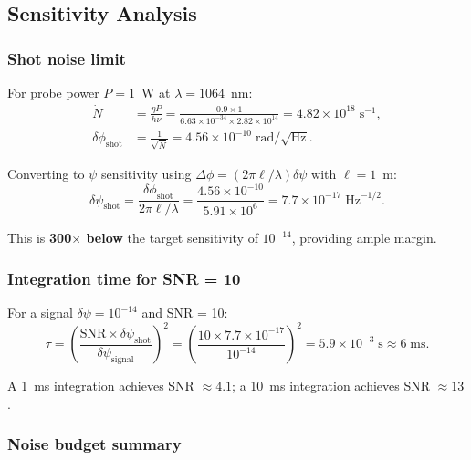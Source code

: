 \documentclass[11pt,letterpaper]{article}
\newcommand{\ee}[1]{\times 10^{#1}}
\newcommand{\psifield}{\psi}
\begin{document}
\subsection{Sensitivity Analysis}

\subsubsection{Shot noise limit}

For probe power $P = 1$~W at $\lambda = 1064$~nm:
\begin{align}
\dot{N} &= \frac{\eta P}{h\nu}
= \frac{0.9 \times 1}{6.63\ee{-34}\times 2.82\ee{14}}
= 4.82\ee{18}\;\text{s}^{-1}, \\
\delta\phi_\text{shot} &= \frac{1}{\sqrt{\dot{N}}}
= 4.56\ee{-10}\;\text{rad}/\sqrt{\text{Hz}}.
\end{align}

Converting to $\psifield$ sensitivity using
$\Delta\phi = (2\pi\ell/\lambda)\delta\psifield$ with $\ell = 1$~m:
\begin{equation}
\delta\psifield_\text{shot} = \frac{\delta\phi_\text{shot}}
{2\pi\ell/\lambda} = \frac{4.56\ee{-10}}{5.91\ee{6}}
= 7.7\ee{-17}\;\text{Hz}^{-1/2}.
\label{eq:psi_sensitivity}
\end{equation}

This is \textbf{300$\times$ below} the target sensitivity of
$10^{-14}$, providing ample margin.

\subsubsection{Integration time for SNR = 10}

For a signal $\delta\psifield = 10^{-14}$ and SNR = 10:
\begin{equation}
\tau = \left(\frac{\text{SNR}\times\delta\psifield_\text{shot}}
{\delta\psifield_\text{signal}}\right)^2
= \left(\frac{10\times 7.7\ee{-17}}{10^{-14}}\right)^2
= 5.9\ee{-3}\;\text{s} \approx 6\;\text{ms}.
\end{equation}

A 1~ms integration achieves SNR $\approx 4.1$; a 10~ms
integration achieves SNR $\approx 13$.

\subsubsection{Noise budget summary}
\end{document}
